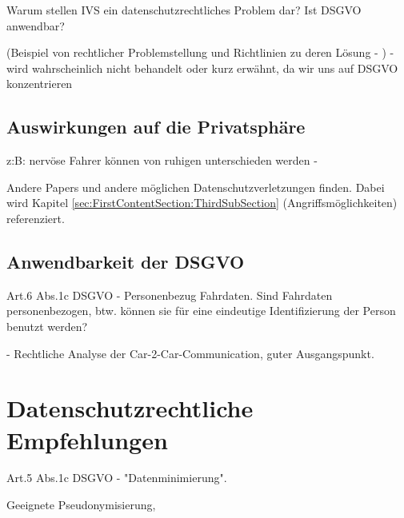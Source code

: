 Warum stellen IVS ein datenschutzrechtliches Problem dar? Ist DSGVO anwendbar? 

(Beispiel von rechtlicher Problemstellung und Richtlinien zu deren Lösung - \cite{EUCooperativeV2X} ) - wird wahrscheinlich nicht behandelt oder kurz erwähnt, da wir uns auf DSGVO konzentrieren


\subsection{Auswirkungen auf die Privatsphäre}
\label{sec:SecondContentSection:FirstSubsection}

z:B: nervöse Fahrer können von ruhigen unterschieden werden - \cite{Dettki2005}

Andere Papers und andere möglichen Datenschutzverletzungen finden. Dabei wird Kapitel  \ref{sec:FirstContentSection:ThirdSubSection} (Angriffsmöglichkeiten) referenziert.

\subsection{Anwendbarkeit der DSGVO}
\label{sec:SecondContentSection:SecondSubsection}

Art.6 Abs.1c DSGVO - Personenbezug Fahrdaten. Sind Fahrdaten personenbezogen, btw. können sie für eine eindeutige Identifizierung der Person benutzt werden?




\cite{Weichert2016} - Rechtliche Analyse der Car-2-Car-Communication, guter Ausgangspunkt.

\section{Datenschutzrechtliche Empfehlungen}
\label{ch:ThirdContentSection}

Art.5 Abs.1c DSGVO - "Datenminimierung". 

Geeignete Pseudonymisierung, 

